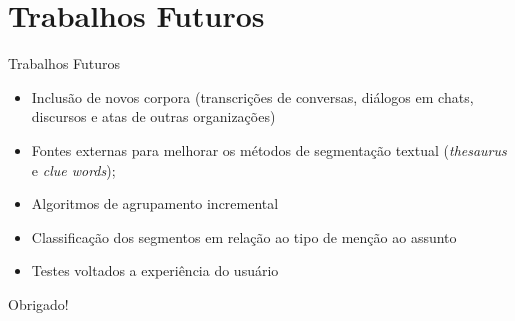 \documentclass[xcolor=dvipsnames]{beamer}
\begin{document}
\section{Trabalhos Futuros}
\begin{frame}{Trabalhos Futuros}
	
	\nblock{} {

	\begin{itemize}
	
\item Inclusão de novos corpora (transcrições de conversas, diálogos em chats, discursos e atas de outras organizações)
\item Fontes externas para melhorar os métodos de segmentação textual  (\textit{thesaurus} e \textit{clue words});
\item Algoritmos de agrupamento incremental
\item Classificação dos segmentos em relação ao tipo de menção ao assunto
\item Testes voltados a experiência do usuário

	\end{itemize}
	
	}
\end{frame}



\begin{frame}{}

\center\LARGE Obrigado!

\end{frame}
\end{document}
